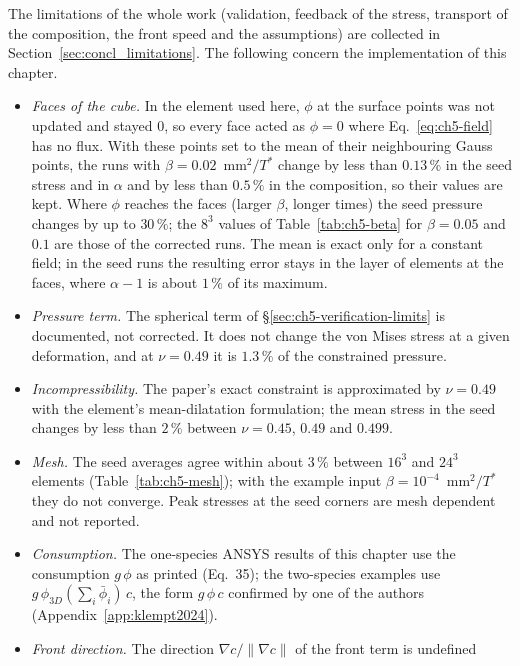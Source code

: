 The limitations of the whole work (validation, feedback of the stress, transport of the composition, the
front speed and the assumptions) are collected in Section~\ref{sec:concl_limitations}. The following concern
the implementation of this chapter.
\begin{itemize}
\item \emph{Faces of the cube.} In the element used here, $\phi$ at the surface
      points was not updated and stayed $0$, so every face acted as $\phi=0$
      where Eq.~\eqref{eq:ch5-field} has no flux. With these points set to the
      mean of their neighbouring Gauss points, the runs with
      $\beta=0.02$~mm$^2/T^*$ change by less than $0.13\,\%$ in the seed stress
      and in $\alpha$ and by less than $0.5\,\%$ in the composition, so their
      values are kept. Where $\phi$ reaches the faces (larger $\beta$, longer
      times) the seed pressure changes by up to $30\,\%$; the $8^3$ values of
      Table~\ref{tab:ch5-beta} for $\beta=0.05$ and $0.1$ are those of the
      corrected runs. The mean is exact only for a constant field; in the seed runs the resulting error
      stays in the layer of elements at the faces, where $\alpha-1$ is about $1\,\%$ of its maximum.
\item \emph{Pressure term.} The spherical term of
      \S\ref{sec:ch5-verification-limits} is documented, not corrected. It does
      not change the von Mises stress at a given deformation, and at
      $\nu=0.49$ it is $1.3\,\%$ of the constrained pressure.
\item \emph{Incompressibility.} The paper's exact constraint is approximated by
      $\nu=0.49$ with the element's mean-dilatation formulation; the mean
      stress in the seed changes by less than $2\,\%$ between $\nu=0.45$,
      $0.49$ and $0.499$.
\item \emph{Mesh.} The seed averages agree within about $3\,\%$ between $16^3$ and $24^3$ elements
      (Table~\ref{tab:ch5-mesh}); with the example input
      $\beta=10^{-4}$~mm$^2/T^*$ they do not converge. Peak stresses at the seed corners
      are mesh dependent and not reported.
\item \emph{Consumption.} The one-species ANSYS results of this chapter use the consumption
      $g\,\phi$ as printed (Eq.~35); the two-species examples use $g\,\phi_{3D}(\sum_i\bar\phi_i)\,c$, the
      form $g\,\phi\,c$ confirmed by one of the authors (Appendix~\ref{app:klempt2024}).
\item \emph{Front direction.} The direction $\nabla c/\|\nabla c\|$ of the front term \fterm{} is undefined

\end{itemize}
